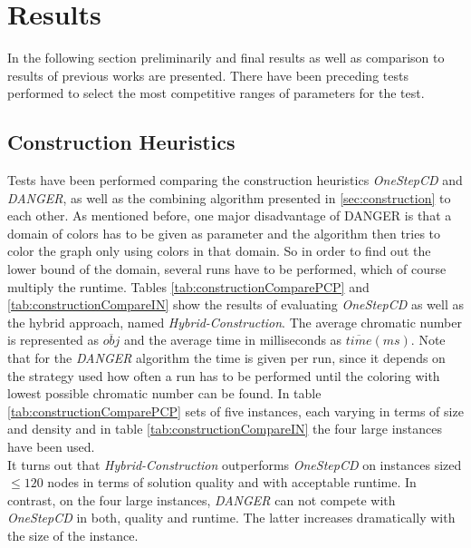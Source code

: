 \section{Results}
\label{sec:resultsss}
In the following section preliminarily and final results as well as comparison to results of previous works are presented. There have been preceding tests performed to select the most competitive ranges of parameters for the test.

\subsection{Construction Heuristics}
\label{sec:constructionheuristics}

Tests have been performed comparing the construction heuristics \textit{OneStepCD} and \textit{DANGER}, as well as the combining algorithm presented in \ref{sec:construction} to each other. As mentioned before, one major disadvantage of DANGER is that a domain of colors has to be given as parameter and the algorithm then tries to color the graph only using colors in that domain. So in order to find out the lower bound of the domain, several runs have to be performed, which of course multiply the runtime. Tables \ref{tab:constructionComparePCP} and \ref{tab:constructionCompareIN} show the results of evaluating \textit{OneStepCD} as well as the hybrid approach, named \textit{Hybrid-Construction}. The average chromatic number is represented as $\overline{obj}$ and the average time in milliseconds as $\overline{time}(ms)$. Note that for the \textit{DANGER} algorithm the time is given per run, since it depends on the strategy used how often a run has to be performed until the coloring with lowest possible chromatic number can be found. In table \ref{tab:constructionComparePCP} sets of five instances, each varying in terms of size and density and in table \ref{tab:constructionCompareIN} the four large instances have been used.\\

It turns out that \textit{Hybrid-Construction} outperforms \textit{OneStepCD} on instances sized $\leq 120$ nodes in terms of solution quality and with acceptable runtime. In contrast, on the four large instances, \textit{DANGER} can not compete with \textit{OneStepCD} in both, quality and runtime. The latter increases dramatically with the size of the instance.  
 
